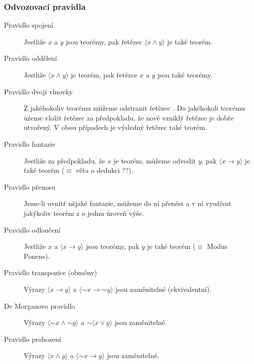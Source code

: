 \documentclass[12pt]{article}
\newcommand{\vnot}[1]{\ensuremath{{\sim}#1}}
\begin{document}
\subsubsection{Odvozovací pravidla}
\begin{description}
    \item[Pravidlo spojení] Jestliže $x$ a $y$ jsou teorémy, pak řetězec
        $\langle x \land y \rangle$ je také teorém.
    
    \item[Pravidlo oddělení] Jestliže $\langle x \land y \rangle$ je teorém,
        pak řetězce $x$ a $y$ jsou také teorémy.

    \item[Pravidlo dvojí vlnovky] Z jakéhokoliv teorému můžeme odstranit
        řetězec \uv{$\sim\sim$}. Do jakéhokoli teorému ůžeme vložit řetězec \uv{$\sim\sim$} za
        předpokladu, že nově vzniklý řetězec je dobře utvořený. V obou případech je
        výsledný řetězec také teorém.

    \item[Pravidlo fantazie] Jestliže za předpokladu, že $x$ je teorém, můžeme odvodit
        $y$, pak $\langle x \rightarrow y \rangle$ je také teorém ($\equiv$ věta o dedukci ??).

    \item[Pravidlo přenosu] Jsme-li uvnitř nějaké fantazie, můžeme do ní přenést
        a v ní využívat jakýkoliv teorém z  o jednu úroveň výše.

    \item[Pravidlo odloučení] Jestliže $x$ a $\langle x \rightarrow y \rangle$ jsou
        teorémy, pak $y$ je také teorém ($\equiv$ Modus Ponens).

    \item[Pravidlo transpozice (obměny)] Výrazy $\langle x \rightarrow y \rangle$
        a $\langle \vnot{x} \rightarrow \vnot{y} \rangle$ jsou zaměnitelné (ekvivalentní).

    \item[De Morganovo pravidlo] Výrazy $\langle \vnot{x} \land \vnot{y} \rangle$ a
        $\vnot{\langle x \lor y \rangle}$ jsou zaměnitelné.

    \item[Pravidlo prohození] Výrazy $\langle x \land y \rangle$ a
        $\langle \vnot{x} \rightarrow y \rangle$ jsou zaměnitelné.
\end{description}
\end{document}
